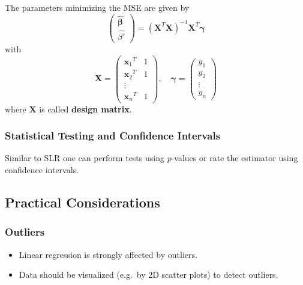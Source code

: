 
The parameters minimizing the MSE are given by
\begin{equation*}
    \begin{pmatrix}
        \hat{\boldsymbol{\beta}} \\
        \widehat{\beta'}
    \end{pmatrix}
    ={(\mathbf{X}^T \mathbf{X})}^{-1}\mathbf{X}^T\mathbf{\gamma}
\end{equation*}
with
\begin{equation*}
    \mathbf{X}=
    \begin{pmatrix}
        {\mathbf{x}_1}^T & 1 \\
        {\mathbf{x}_2}^T & 1 \\
        \vdots                  \\
        {\mathbf{x}_n}^T & 1
    \end{pmatrix},\quad
    \mathbf{\gamma}=
    \begin{pmatrix}
        y_1    \\
        y_2    \\
        \vdots \\
        y_n
    \end{pmatrix}
\end{equation*}
where $\mathbf{X}$ is called \textbf{design matrix}.

\subsubsection{Statistical Testing and Confidence Intervals}
Similar to SLR one can perform tests using $p$-values or rate the estimator using confidence intervals.

\subsection{Practical Considerations}

\subsubsection{Outliers}
\begin{itemize}
    \item Linear regression is strongly affected by outliers.
    \item Data should be visualized (e.g.\ by 2D scatter plots) to detect outliers.
\end{itemize}

